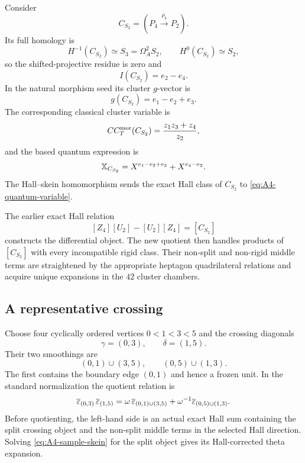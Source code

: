 Consider
\begin{equation}
 C_{S_2}=(P_4\xrightarrow{\rho_b}P_2).
 \label{eq:A4-CS2}
\end{equation}
Its full homology is
\[
 H^{-1}(C_{S_2})\simeq S_3=\Omega_A^2S_2,
 \qquad
 H^0(C_{S_2})\simeq S_2,
\]
so the shifted-projective residue is zero and
\[
 I(C_{S_2})=e_2-e_4.
\]
In the natural morphism seed its cluster $g$-vector is
\[
 g(C_{S_2})=e_1-e_2+e_3.
\]
The corresponding classical cluster variable is
\begin{equation}
 CC_T^{\rm mor}(C_{S_2})
 =\frac{z_1z_3+z_4}{z_2},
 \label{eq:A4-classical-variable}
\end{equation}
and the based quantum expression is
\begin{equation}
 \mathbb X_{C_{S_2}}
 =X^{e_1-e_2+e_3}+X^{e_4-e_2}.
 \label{eq:A4-quantum-variable}
\end{equation}
The Hall--skein homomorphism sends the exact Hall class of
$C_{S_2}$ to \eqref{eq:A4-quantum-variable}.

The earlier exact Hall relation
\[
 [Z_4][U_2]-[U_2][Z_4]=[C_{S_2}]
\]
constructs the differential object.  The new quotient then handles products
of $[C_{S_2}]$ with every incompatible rigid class.  Their non-split and
non-rigid middle terms are straightened by the appropriate heptagon
quadrilateral relations and acquire unique expansions in the $42$ cluster
chambers.

\subsection{A representative crossing}

Choose four cyclically ordered vertices $0<1<3<5$ and the crossing diagonals
\[
 \gamma=(0,3),
 \qquad
 \delta=(1,5).
\]
Their two smoothings are
\[
 (0,1)\cup(3,5),
 \qquad
 (0,5)\cup(1,3).
\]
The first contains the boundary edge $(0,1)$ and hence a frozen unit.  In the
standard normalization the quotient relation is
\begin{equation}
 \overline{\varepsilon}_{(0,3)}\,
 \overline{\varepsilon}_{(1,5)}
 =\omega\,
   \overline{\varepsilon}_{(0,1)\cup(3,5)}
  +\omega^{-1}
   \overline{\varepsilon}_{(0,5)\cup(1,3)}.
 \label{eq:A4-sample-skein}
\end{equation}
Before quotienting, the left-hand side is an actual exact Hall sum containing
the split crossing object and the non-split middle terms in the selected Hall
direction.  Solving \eqref{eq:A4-sample-skein} for the split object gives its
Hall-corrected theta expansion.

